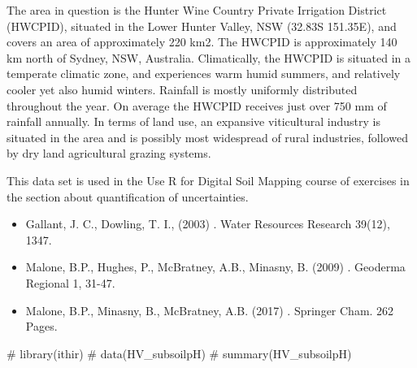 \documentclass[a4paper]{book}
\begin{document}
%
\begin{Details}
The area in question is the Hunter Wine Country Private Irrigation District (HWCPID), situated in the Lower Hunter Valley, NSW (32.83S 151.35E), and covers an area of approximately 220 km2. The HWCPID is approximately 140 km north of Sydney, NSW, Australia. Climatically, the HWCPID is situated in a temperate climatic zone, and experiences warm humid summers, and relatively cooler yet also humid winters. Rainfall is mostly uniformly distributed throughout the year. On average the HWCPID receives just over 750 mm of rainfall annually. In terms of land use, an expansive viticultural industry is situated in the area and is possibly most widespread
of rural industries, followed by dry land agricultural grazing systems.
\end{Details}
%
\begin{Note}
This data set is used in the Use R for Digital Soil Mapping course of exercises in the section about quantification of uncertainties.
\end{Note}
%
\begin{References}
\begin{itemize}

\item{} Gallant, J. C., Dowling, T. I., (2003) . Water Resources Research 39(12), 1347. 
\item{} Malone, B.P., Hughes, P.,  McBratney, A.B., Minasny, B. (2009) . Geoderma Regional 1, 31-47.
\item{} Malone, B.P., Minasny, B., McBratney, A.B. (2017) . Springer Cham. 262 Pages.

\end{itemize}

\end{References}
%
\begin{Examples}
\begin{ExampleCode}

# library(ithir)
# data(HV_subsoilpH)
# summary(HV_subsoilpH)

\end{ExampleCode}
\end{Examples}
\end{document}
